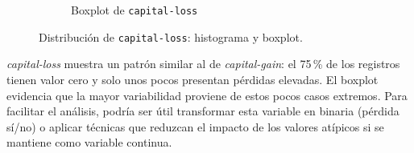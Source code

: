 \documentclass[12pt,a4paper]{article}
\begin{document}
\begin{enumerate}
\begin{figure}[H]
\begin{subfigure}[b]{0.45\textwidth}
        \caption{Boxplot de \texttt{capital-loss}}
        \label{fig:capital_loss_boxplot}
      \end{subfigure}
      \caption{Distribución de \texttt{capital-loss}: histograma y boxplot.}
      \label{fig:capital_loss_visual}
    \end{figure}

    \emph{capital-loss} muestra un patrón similar al de \emph{capital-gain}: el 75\,\% de los registros 
    tienen valor cero y solo unos pocos presentan pérdidas elevadas. El boxplot evidencia que la mayor 
    variabilidad proviene de estos pocos casos extremos. Para facilitar el análisis, podría ser útil 
    transformar esta variable en binaria (pérdida sí/no) o aplicar técnicas que reduzcan el impacto de los 
    valores atípicos si se mantiene como variable continua.


\end{enumerate}
\end{document}
